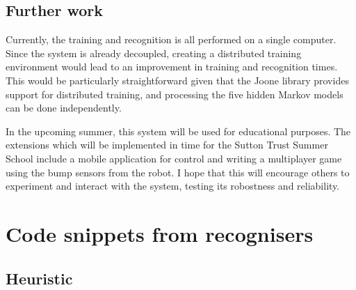 \documentclass[12pt,a4,notitlepage]{report}
\renewcommand{\_}{\texttt{\symbol{95}}}
\newcommand{\<}{\texttt{\symbol{60}}}
\renewcommand{\>}{\texttt{\symbol{62}}}
\newcommand{\class}[1]{\textbf{#1}}
\begin{document}
\section{Further work}

Currently, the training and recognition is all performed on a single computer. Since the system is already decoupled, creating a distributed training environment would lead to an improvement in training and recognition times. This would be particularly straightforward given that the Joone library provides support for distributed training, and processing the five hidden Markov models can be done independently.

In the upcoming summer, this system will be used for educational purposes. The extensions which will be implemented in time for the Sutton Trust Summer School include a mobile application for control and writing a multiplayer game using the bump sensors from the robot. I hope that this will encourage others to experiment and interact with the system, testing its robostness and reliability.



\appendix

\chapter{Code snippets from recognisers}

\section{\class{Heuristic}}
\end{document}
